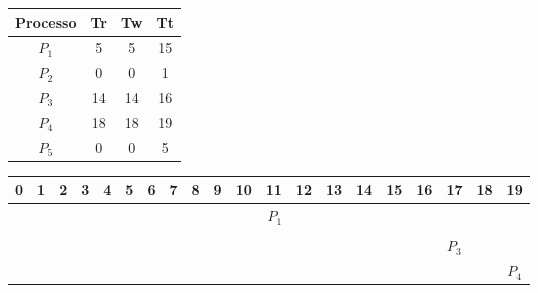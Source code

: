 \documentclass[a4paper]{article}
\begin{document}
\begin{table}[h!]
    \centering
    \label{my-label}
    \begin{tabular}{|c|c|c|c|}
        \hline
        Processo & Tr & Tw & Tt \\ \hline
        $P_1$    & 5  & 5  & 15 \\ \hline
        $P_2$    & 0  & 0  & 1  \\ \hline
        $P_3$    & 14 & 14 & 16 \\ \hline
        $P_4$    & 18 & 18 & 19 \\ \hline
        $P_5$    & 0  & 0  & 5  \\ \hline
    \end{tabular}
\end{table}

\begin{table}[h]
    \centering
    \label{my-label}
    \begin{tabular}{|c|ccccc|cccccccccc|ccc|c|}
        \hline
        0                                                    & 1                                                  & 2                                                   & 3                                                  & 4                             & 5 & 6 & 7 & 8 & 9 & 10 & 11 & 12 & 13 & 14 & 15 & 16 & 17 & 18 & 19 \\ \hline
                                                             & \multicolumn{5}{c|}{}                              & \multicolumn{10}{c|}{\cellcolor[HTML]{656565}$P_1$} & \multicolumn{3}{c|}{}                              &                                                                                                     \\ \hline
        \cellcolor[HTML]{656565}{\color[HTML]{000000} $P_2$} & \multicolumn{5}{c|}{}                              & \multicolumn{10}{c|}{}                              & \multicolumn{3}{c|}{}                              &                                                                                                     \\ \hline
                                                             & \multicolumn{5}{c|}{}                              & \multicolumn{10}{c|}{}                              & \multicolumn{3}{c|}{\cellcolor[HTML]{656565}$P_3$} &                                                                                                     \\ \hline
                                                             & \multicolumn{5}{c|}{}                              & \multicolumn{10}{c|}{}                              & \multicolumn{3}{c|}{}                              & \cellcolor[HTML]{656565}$P_4$                                                                       \\ \hline

\end{tabular}
\end{table}
\end{document}
